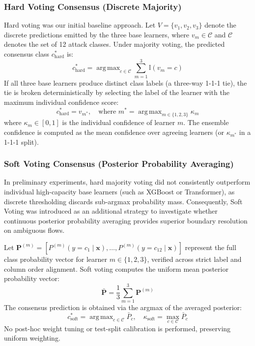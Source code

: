 \documentclass[conference]{IEEEtran}
\begin{document}
\subsubsection{Hard Voting Consensus (Discrete Majority)}
Hard voting was our initial baseline approach. Let $V = \{v_1, v_2, v_3\}$ denote the discrete predictions emitted by the three base learners, where $v_m \in \mathcal{C}$ and $\mathcal{C}$ denotes the set of 12 attack classes. Under majority voting, the predicted consensus class $c^*_{\text{hard}}$ is:
\begin{equation}
c^*_{\text{hard}} = \operatorname{arg\,max}_{c \in \mathcal{C}} \sum_{m=1}^3 \mathbb{I}(v_m = c)
\end{equation}
If all three base learners produce distinct class labels (a three-way 1-1-1 tie), the tie is broken deterministically by selecting the label of the learner with the maximum individual confidence score:
\begin{equation}
c^*_{\text{hard}} = v_{m^*}, \quad \text{where } m^* = \operatorname{arg\,max}_{m \in \{1, 2, 3\}} \kappa_m
\end{equation}
where $\kappa_m \in [0, 1]$ is the individual confidence of learner $m$. The ensemble confidence is computed as the mean confidence over agreeing learners (or $\kappa_{m^*}$ in a 1-1-1 split).

\subsubsection{Soft Voting Consensus (Posterior Probability Averaging)}
In preliminary experiments, hard majority voting did not consistently outperform individual high-capacity base learners (such as XGBoost or Transformer), as discrete thresholding discards sub-argmax probability mass. Consequently, Soft Voting was introduced as an additional strategy to investigate whether continuous posterior probability averaging provides superior boundary resolution on ambiguous flows.

Let $\mathbf{P}^{(m)} = [P^{(m)}(y = c_1 \mid \mathbf{x}), \dots, P^{(m)}(y = c_{12} \mid \mathbf{x})]$ represent the full class probability vector for learner $m \in \{1, 2, 3\}$, verified across strict label and column order alignment. Soft voting computes the uniform mean posterior probability vector:
\begin{equation}
\bar{\mathbf{P}} = \frac{1}{3} \sum_{m=1}^3 \mathbf{P}^{(m)}
\end{equation}
The consensus prediction is obtained via the argmax of the averaged posterior:
\begin{equation}
c^*_{\text{soft}} = \operatorname{arg\,max}_{c \in \mathcal{C}} \bar{P}_c, \quad \kappa_{\text{soft}} = \max_{c \in \mathcal{C}} \bar{P}_c
\end{equation}
No post-hoc weight tuning or test-split calibration is performed, preserving uniform weighting.
\end{document}
